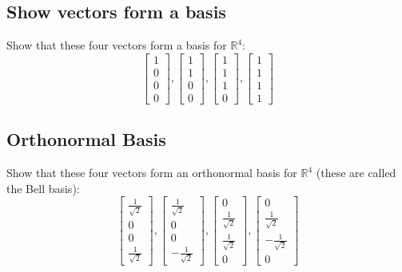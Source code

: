 \documentclass[11pt]{article}
\begin{document}
\subsection{Show vectors form a basis}

Show that these four vectors form a basis for $\mathbb{R}^4$:
\[
\begin{bmatrix}
   1        \\
    0      \\
   0       \\
    0      
\end{bmatrix}
,
\begin{bmatrix}
      1        \\
    1      \\
   0       \\
    0      
\end{bmatrix}
,
\begin{bmatrix}
   1        \\
    1     \\
   1    \\
    0      
\end{bmatrix}
,
\begin{bmatrix}
       1        \\
    1      \\
   1       \\
    1      
\end{bmatrix}
\]

\subsection{Orthonormal Basis}

Show that these four vectors form an orthonormal basis for $\mathbb{R}^4$ (these are called the Bell basis):
\[
\begin{bmatrix}
   \frac{1}{\sqrt{2}} \\
    0      \\
   0       \\
    \frac{1}{\sqrt{2}}       
\end{bmatrix}
,
\begin{bmatrix}
      \frac{1}{\sqrt{2}}         \\
    0      \\
   0       \\
    -\frac{1}{\sqrt{2}}      
\end{bmatrix}
,
\begin{bmatrix}
   0     \\
    \frac{1}{\sqrt{2}}     \\
   \frac{1}{\sqrt{2}}  \\
    0      
\end{bmatrix}
,
\begin{bmatrix}
      0     \\
    \frac{1}{\sqrt{2}}     \\
-\frac{1}{\sqrt{2}}  \\
    0    
\end{bmatrix}
\]
\end{document}
